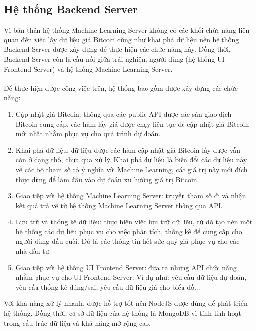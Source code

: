\subsection{ Hệ thống Backend Server}
Vì bản thân hệ thống Machine Learning Server không có các khối chức năng 
liên quan đến việc  
lấy dữ liệu giá Bitcoin cũng như khai phá dữ liệu nên hệ thống Backend Server
được xây dựng để thực hiện các chức năng này. Đồng thời, Backend Server còn là 
cầu nối giữa trải nghiệm người dùng (hệ thống UI Frontend Server) và hệ thống 
Machine Learning Server.\\\\
Để thực hiện được công việc trên, hệ thống bao gồm được xây dựng các chức năng:\\
\begin{enumerate}
\item Cập nhật giá Bitcoin: thông qua các public API được các sàn giao dịch 
Bitcoin cung cấp, các hàm lấy giá được chạy liên tục để cập nhật giá Bitcoin 
mới nhất nhằm phục vụ cho quá trình dự đoán.
\item Khai phá dữ liệu: dữ liệu được các hàm cập nhật giá Bitcoin lấy được vẫn 
còn ở dạng thô, chưa qua xử lý. Khai phá dữ liệu là biến đổi các dữ liệu này 
về các bộ tham số có ý nghĩa với Machine Learning, các giá trị này mới đích thực 
dùng để làm đầu vào dự đoán xu hướng giá trị Bitcoin.
\item Giao tiếp với hệ thống Machine Learning Server: truyền tham số đi và nhận 
kết quả trả về từ hệ thống Machine Learning Server thông qua API.
\item Lưu trữ và thống kê dữ liệu: thực hiện việc lưu trữ dữ liệu, từ đó tạo nên 
một hệ thống các dữ liệu phục vụ cho việc phân tích, thống kê để cung cấp cho người 
dùng đầu cuối. Đó là các thông tin hết sức quý giá phục vụ cho các nhà đầu tư.
\item Giao tiếp với hệ thống UI Frontend Server: đưa ra những API chức năng nhằm 
phục vụ cho UI Frontend Server. Ví dụ như: yêu cầu dữ liệu dự đoán, yêu cầu 
thống kê đúng/sai, yêu cầu dữ liệu giá cho biểu đồ...
\end{enumerate}
Với khả năng xử lý nhanh, được hỗ trợ tốt nên NodeJS được dùng để phát triển 
hệ thống. Đồng thời, cơ sở dữ liệu của hệ thống là MongoDB vì tính linh hoạt 
trong cấu trúc dữ liệu và khả năng mở rộng cao.\\\\

